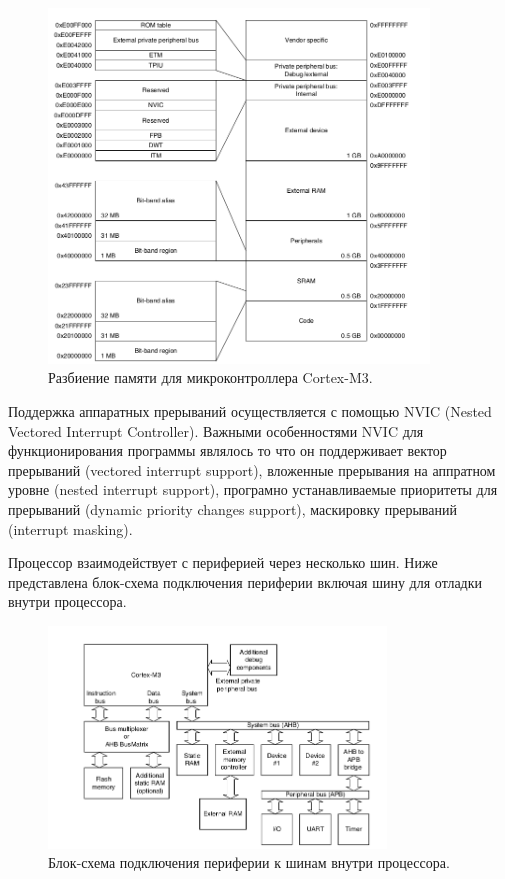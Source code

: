 \begin{figure}[h!]
    \centering
    \includegraphics[width=0.9\textwidth]{predefined_memory_map.png}
    \caption{Разбиение памяти для микроконтроллера Cortex-M3.}
\end{figure}


Поддержка аппаратных прерываний осуществляется с помощью NVIC (Nested Vectored Interrupt Controller). Важными особенностями NVIC для функционирования программы являлось то что он поддерживает вектор прерываний (vectored interrupt support), вложенные прерывания на аппратном уровне (nested interrupt support), програмно устанавливаемые приоритеты для прерываний (dynamic priority changes support), маскировку прерываний (interrupt masking).


Процессор взаимодействует с периферией через несколько шин. Ниже представлена блок-схема подключения периферии включая шину для отладки внутри процессора.

\begin{figure}[h!]
    \centering
    \includegraphics[width=0.8\textwidth]{cortex_m3_peripherals_block_diagram.png}
    \caption{Блок-схема подключения периферии к шинам внутри процессора.}
\end{figure}


